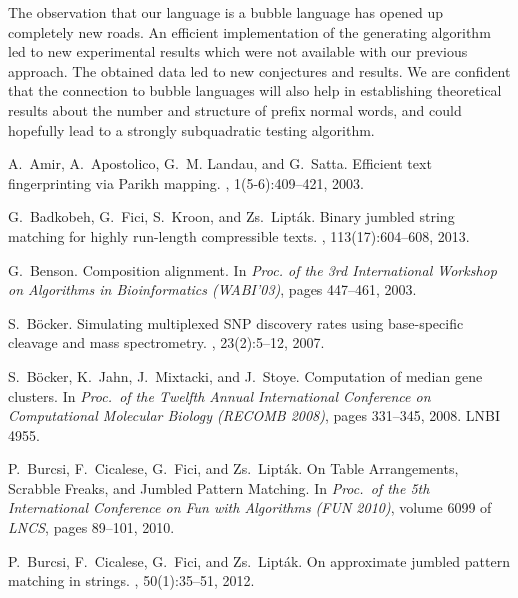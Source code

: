 \documentclass[11pt,a4paper]{llncs}
\begin{document}
The observation that our language is a bubble language has opened up
completely new roads. An efficient implementation of the generating algorithm
led to new experimental results which were not available with our previous approach. The obtained
data led to new conjectures and results. We are confident that the connection
to bubble languages will also help in establishing theoretical results about
the number and structure of prefix normal words, and could hopefully lead to a strongly subquadratic testing algorithm.




\begin{small}
\begin{thebibliography}{10}

A.~Amir, A.~Apostolico, G.~M. Landau, and G.~Satta.
\newblock Efficient text fingerprinting via {Parikh} mapping.
, 1(5-6):409--421, 2003.

G.~Badkobeh, G.~Fici, S.~Kroon, and {\relax Zs}.~Lipt{\'a}k.
\newblock Binary jumbled string matching for highly run-length compressible
  texts.
, 113(17):604--608, 2013.

G.~Benson.
\newblock Composition alignment.
\newblock In {\em Proc. of the 3rd International Workshop on Algorithms in
  Bioinformatics (WABI'03)}, pages 447--461, 2003.

S.~B{\"o}cker.
\newblock Simulating multiplexed {SNP} discovery rates using base-specific
  cleavage and mass spectrometry.
, 23(2):5--12, 2007.

S.~B\"ocker, K.~Jahn, J.~Mixtacki, and J.~Stoye.
\newblock Computation of median gene clusters.
\newblock In {\em Proc.\ of the Twelfth Annual International Conference on
  Computational Molecular Biology (RECOMB 2008)}, pages 331--345, 2008.
\newblock LNBI 4955.

P.~Burcsi, F.~Cicalese, G.~Fici, and {\relax Zs}.~Lipt{\'a}k.
\newblock On {T}able {A}rrangements, {S}crabble {F}reaks, and {J}umbled
  {P}attern {M}atching.
\newblock In {\em Proc.\ of the 5th International Conference on Fun with
  Algorithms ({FUN} 2010)}, volume 6099 of {\em LNCS}, pages 89--101, 2010.

P.~Burcsi, F.~Cicalese, G.~Fici, and {\relax Zs}.~Lipt{\'a}k.
\newblock On approximate jumbled pattern matching in strings.
, 50(1):35--51, 2012.


\end{thebibliography}
\end{small}
\end{document}
